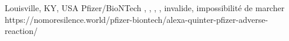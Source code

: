           {Louisville, KY, USA}
          {}
          {Pfizer/BioNTech}
          {}
          {
            ,
            ,
            ,
            ,
            invalide, %
            impossibilité de marcher %
          }
          {https://nomoresilence.world/pfizer-biontech/alexa-quinter-pfizer-adverse-reaction/}
